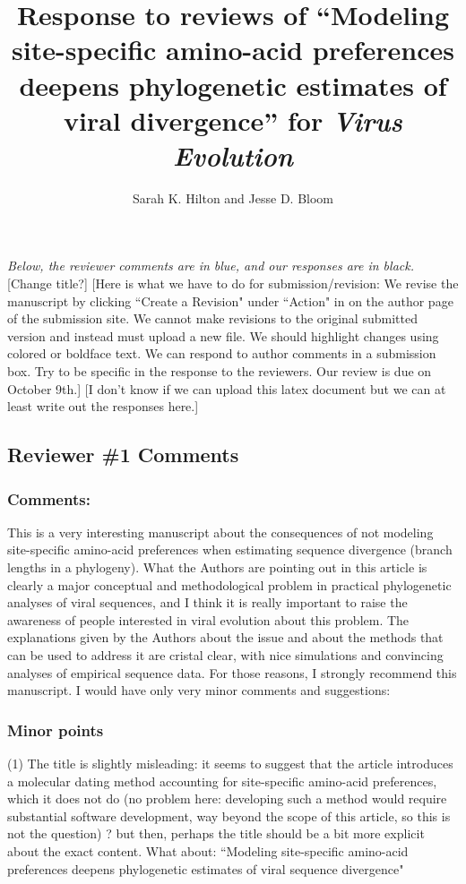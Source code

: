 \documentclass[11pt, oneside]{article}   	%
\title{Response to reviews of ``Modeling site-specific amino-acid preferences deepens phylogenetic estimates of viral divergence'' for \textit{Virus Evolution}}
\author{Sarah K. Hilton and Jesse D. Bloom}
\newcommand{\response}[1]{{\color{black}#1}}
\newcommand\skhcomment[1]{{\color{magenta}[#1]}}
\begin{document}
\maketitle

\emph{Below, the reviewer comments {\color{blue} are in blue}, and our responses are in black.}
\skhcomment{Change title?}
\skhcomment{Here is what we have to do for submission/revision: We revise the manuscript by clicking ``Create a Revision" under ``Action" in on the author page of the submission site. We cannot make revisions to the original submitted version and instead must upload a new file. We should highlight changes using colored or boldface text. We can respond to author comments in a submission box. Try to be specific in the response to the reviewers. Our review is due on October 9th.}
\skhcomment{I don't know if we can upload this latex document but we can at least write out the responses here.}

\color{blue}

\subsection*{Reviewer \#1 Comments}

\subsubsection*{Comments:} 
This is a very interesting manuscript about the consequences of not modeling site-specific amino-acid preferences when estimating sequence divergence (branch lengths in a phylogeny). 
What the Authors are pointing out in this article is clearly a major conceptual and methodological problem in practical phylogenetic analyses of viral sequences, and I think it is really important to raise the awareness of people interested in viral evolution about this problem. 
The explanations given by the Authors about the issue and about the methods that can be used to address it are cristal clear, with nice simulations and convincing analyses of empirical sequence data. 
For those reasons, I strongly recommend this manuscript. 
I would have only very minor comments and suggestions: 

\response{}

\subsubsection*{Minor points} 

(1) The title is slightly misleading: it seems to suggest that the article introduces a molecular dating method accounting for site-specific amino-acid preferences, which it does not do (no problem here: developing such a method would require substantial software development, way beyond the scope of this article, so this is not the question) ? but then, perhaps the title should be a bit more explicit about the exact content. 
What about:  ``Modeling site-specific amino-acid preferences deepens phylogenetic estimates of viral sequence divergence" 
\response{}
\end{document}
